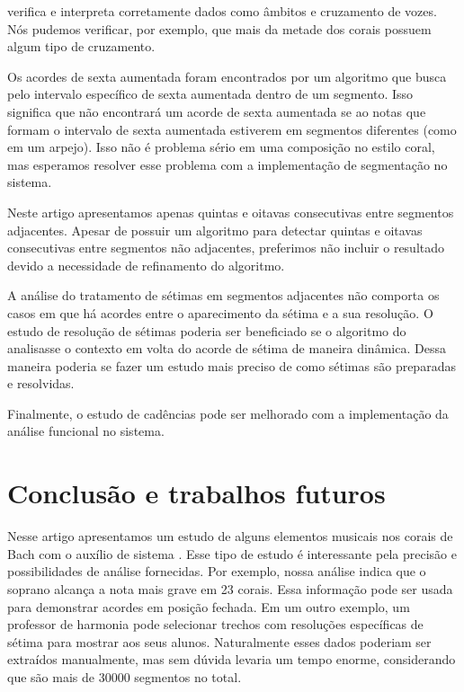 \rameau{} verifica e interpreta corretamente dados como âmbitos e
cruzamento de vozes. Nós pudemos verificar, por exemplo, que mais da
metade dos corais possuem algum tipo de cruzamento.

Os acordes de sexta aumentada foram encontrados por um algoritmo que
busca pelo intervalo específico de sexta aumentada dentro de um
segmento. Isso significa que \rameau{} não encontrará um acorde de
sexta aumentada se ao notas que formam o intervalo de sexta aumentada
estiverem em segmentos diferentes (como em um arpejo). Isso não é
problema sério em uma composição no estilo coral, mas esperamos
resolver esse problema com a implementação de segmentação no sistema.

Neste artigo apresentamos apenas quintas e oitavas consecutivas entre
segmentos adjacentes. Apesar de \rameau{} possuir um algoritmo para
detectar quintas e oitavas consecutivas entre segmentos não
adjacentes, preferimos não incluir o resultado devido a necessidade de
refinamento do algoritmo.

A análise do tratamento de sétimas em segmentos adjacentes não
comporta os casos em que há acordes entre o aparecimento da sétima e a
sua resolução. O estudo de resolução de sétimas poderia ser
beneficiado se o algoritmo do \rameau{} analisasse o contexto em volta
do acorde de sétima de maneira dinâmica. Dessa maneira poderia se
fazer um estudo mais preciso de como sétimas são preparadas e
resolvidas.

Finalmente, o estudo de cadências pode ser melhorado com a
implementação da análise funcional no sistema.

\section{Conclusão e trabalhos futuros}
\label{sec:concl-e-trab}

Nesse artigo apresentamos um estudo de alguns elementos musicais nos
corais de Bach com o auxílio de sistema \rameau{}. Esse tipo de estudo
é interessante pela precisão e possibilidades de análise fornecidas.
Por exemplo, nossa análise indica que o soprano alcança a nota mais
grave em 23 corais. Essa informação pode ser usada para demonstrar
acordes em posição fechada. Em um outro exemplo, um professor de
harmonia pode selecionar trechos com resoluções específicas de sétima
para mostrar aos seus alunos. Naturalmente esses dados poderiam ser
extraídos manualmente, mas sem dúvida levaria um tempo enorme,
considerando que são mais de 30000 segmentos no total.

